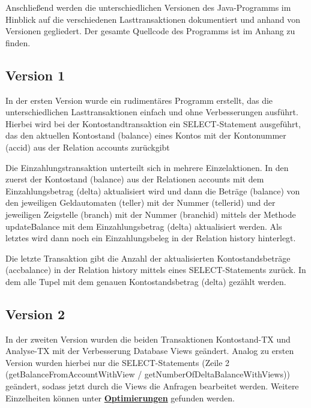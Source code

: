 Anschließend werden die unterschiedlichen Versionen des Java-Programms im Hinblick auf die verschiedenen Lasttransaktionen dokumentiert und anhand von Versionen gegliedert.
Der gesamte Quellcode des Programms ist im Anhang zu finden.

\subsection{Version 1}\label{subsec:version1}
In der ersten Version wurde ein rudimentäres Programm erstellt, das die unterschiedlichen Lasttransaktionen einfach und ohne Verbesserungen ausführt.
Hierbei wird bei der Kontostandtransaktion ein SELECT-Statement ausgeführt, das den aktuellen Kontostand (balance) eines Kontos mit der Kontonummer (accid) aus der Relation accounts zurückgibt

Die Einzahlungstransaktion unterteilt sich in mehrere Einzelaktionen.
In den zuerst der Kontostand (balance) aus der Relationen accounts mit dem Einzahlungsbetrag (delta) aktualisiert wird und dann die Beträge (balance) von den jeweiligen Geldautomaten (teller) mit der Nummer (tellerid) und der jeweiligen Zeigstelle (branch) mit der Nummer (branchid) mittels der Methode updateBalance mit dem Einzahlungsbetrag (delta) aktualisiert werden.
Als letztes wird dann noch ein Einzahlungsbeleg in der Relation history hinterlegt.

Die letzte Transaktion gibt die Anzahl der aktualisierten Kontostandsbeträge (accbalance) in der Relation history mittels eines SELECT-Statements zurück.
In dem alle Tupel mit dem genauen Kontostandsbetrag (delta) gezählt werden.


\subsection{Version 2}\label{subsec:version2}
In der zweiten Version wurden die beiden Transaktionen Kontostand-TX und Analyse-TX mit der Verbesserung Database Views geändert.
Analog zu ersten Version wurden hierbei nur die SELECT-Statements (Zeile 2 (getBalanceFromAccountWithView / getNumberOfDeltaBalanceWithViews)) geändert, sodass jetzt durch die Views die Anfragen bearbeitet werden.
Weitere Einzelheiten können unter \hyperref[sec:optimierungen]{\textbf{Optimierungen}} gefunden werden.



